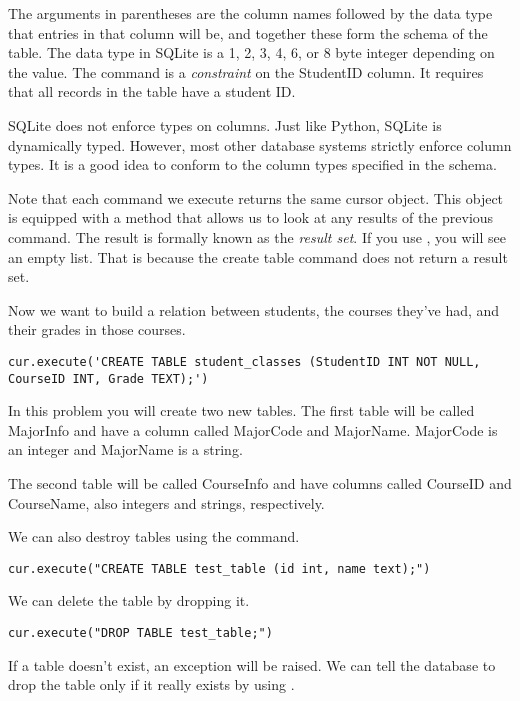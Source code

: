 The arguments in parentheses are the column names followed by the data type that entries in that column will be,
and together these form the schema of the table.
The  data type in SQLite is a 1, 2, 3, 4, 6, or 8 byte integer depending on the value.
The  command is a \emph{constraint} on the StudentID column.  It requires that all records in the table have a student ID.

\begin{info}
SQLite does not enforce types on columns.
Just like Python, SQLite is dynamically typed.
However, most other database systems strictly enforce column types.
It is a good idea to conform to the column types specified in the schema.
\end{info}


Note that each command we execute returns the same cursor object.  This object is equipped with a method that allows us to look
at any results of the previous command.  The result is formally known as the \emph{result set}.
If you use , you will see an empty list.
That is because the create table command does not return a result set.

Now we want to build a relation between students, the courses they've had, and their grades in those courses.
\begin{lstlisting}
cur.execute('CREATE TABLE student_classes (StudentID INT NOT NULL, CourseID INT, Grade TEXT);')
\end{lstlisting}

\begin{problem}
In this problem you will create two new tables.
The first table will be called MajorInfo and have a column called MajorCode and MajorName.
MajorCode is an integer and MajorName is a string.

The second table will be called CourseInfo and have columns called CourseID and CourseName, also integers and strings, respectively.
\label{prob:new_tables}
\end{problem}

We can also destroy tables using the  command.
\begin{lstlisting}
cur.execute("CREATE TABLE test_table (id int, name text);")
\end{lstlisting}
We can delete the table by dropping it.
\begin{lstlisting}
cur.execute("DROP TABLE test_table;")
\end{lstlisting}
If a table doesn't exist, an exception will be raised.
We can tell the database to drop the table only if it really exists by using .

